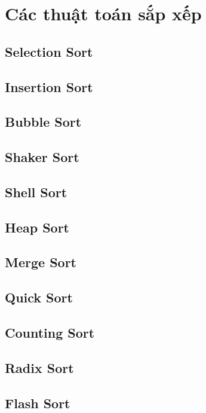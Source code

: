 \section{Các thuật toán sắp xếp}

\subsection{Selection Sort}

\newpage

\subsection{Insertion Sort}

\newpage
\subsection{Bubble Sort}

\newpage

\subsection{Shaker Sort}

\newpage


\subsection{Shell Sort}

\newpage

\subsection{Heap Sort}

\newpage

\subsection{Merge Sort}

\newpage


\subsection{Quick Sort}

\newpage

\subsection{Counting Sort}

\newpage

\subsection{Radix Sort}

\newpage

\subsection{Flash Sort}

\newpage













